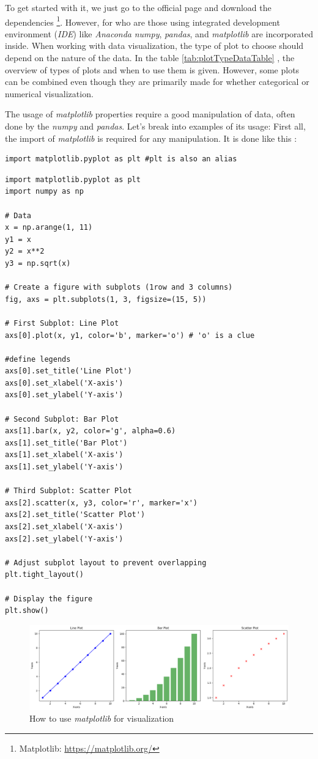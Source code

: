 \documentclass[12pt,a4paper]{report}
\begin{document}
To get started with it, we just go to the official page and download the dependencies \footnote{Matplotlib: \url{https://matplotlib.org/}}. However, for who are those using integrated development environment (\textit{IDE}) like \textit{Anaconda} \textit{numpy}, \textit{pandas}, and \textit{matplotlib} are incorporated inside.
When working with data visualization, the type of plot to choose should depend on the nature of the data. In the table \ref{tab:plotTypeDataTable} , the overview of types of plots and when to use them is given. However, some plots can be combined even though they are primarily made for whether categorical or numerical visualization. 

\noindent The usage of \textit{matplotlib} properties require a good manipulation of data, often done by the \textit{numpy} and \textit{pandas}. Let's break into examples of its usage: \newline
First all, the import of \textit{matplotlib} is required for any manipulation. It is done like this :
\begin{lstlisting}[style=stylepython]
import matplotlib.pyplot as plt #plt is also an alias
\end{lstlisting} 
 
\begin{lstlisting}[style=stylepython]
import matplotlib.pyplot as plt
import numpy as np

# Data
x = np.arange(1, 11)
y1 = x
y2 = x**2
y3 = np.sqrt(x)

# Create a figure with subplots (1row and 3 columns)
fig, axs = plt.subplots(1, 3, figsize=(15, 5))

# First Subplot: Line Plot   
axs[0].plot(x, y1, color='b', marker='o') # 'o' is a clue

#define legends
axs[0].set_title('Line Plot')
axs[0].set_xlabel('X-axis')
axs[0].set_ylabel('Y-axis')

# Second Subplot: Bar Plot
axs[1].bar(x, y2, color='g', alpha=0.6)
axs[1].set_title('Bar Plot')
axs[1].set_xlabel('X-axis')
axs[1].set_ylabel('Y-axis')

# Third Subplot: Scatter Plot 
axs[2].scatter(x, y3, color='r', marker='x')
axs[2].set_title('Scatter Plot')
axs[2].set_xlabel('X-axis')
axs[2].set_ylabel('Y-axis')

# Adjust subplot layout to prevent overlapping
plt.tight_layout()

# Display the figure
plt.show()
\end{lstlisting}  

\begin{figure}
	\centering
	\includegraphics[width=1\linewidth]{matplotLibExample}
	\caption{How to use \textit{matplotlib} for visualization}
	\label{fig:matplotlibexample}
\end{figure} 
\end{document}
